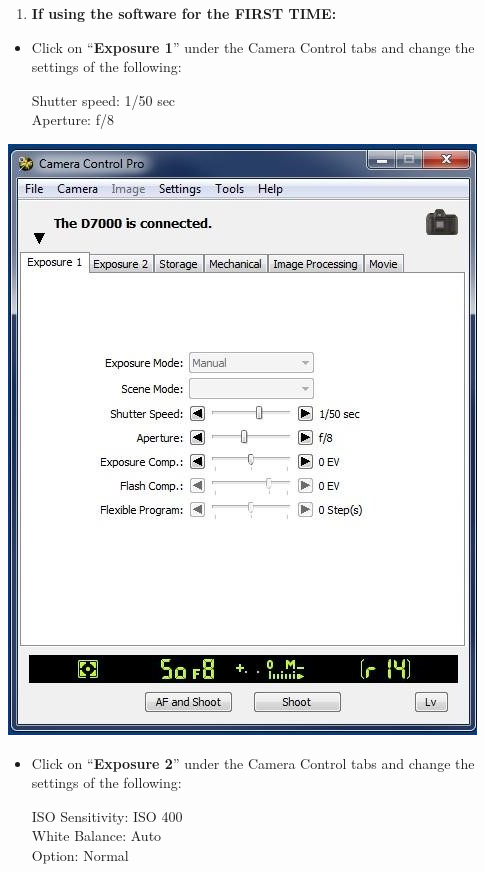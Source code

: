 \documentclass[]{book}
\providecommand{\tightlist}{%
  \setlength{\itemsep}{0pt}\setlength{\parskip}{0pt}}
\begin{document}
\begin{enumerate}
\def\labelenumi{\arabic{enumi}.}
\setcounter{enumi}{4}
\tightlist
\item
  \textbf{If using the software for the FIRST TIME:}
\end{enumerate}

\begin{itemize}
\item
  Click on ``\textbf{Exposure 1}'' under the Camera Control tabs and change the settings of the following:

  Shutter speed: 1/50 sec\\
  Aperture: f/8
\end{itemize}

\includegraphics{images/Camera3.jpg}

\begin{itemize}
\item
  Click on ``\textbf{Exposure 2}'' under the Camera Control tabs and change the settings of the following:

  ISO Sensitivity: ISO 400\\
  White Balance: Auto\\
  Option: Normal
\end{itemize}
\end{document}
